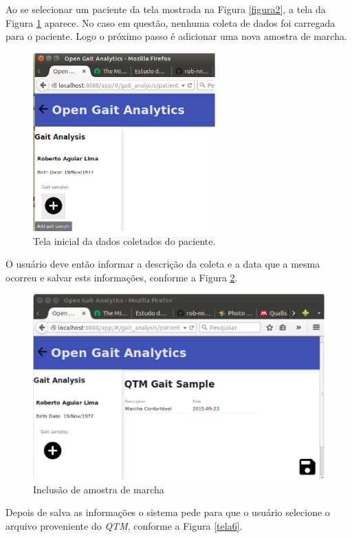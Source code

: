 Ao se selecionar um paciente da tela mostrada na Figura \ref{figura2}, a tela da Figura \ref{tela4} aparece. No caso em questão, nenhuma coleta de dados foi carregada para o paciente. Logo o próximo passo é adicionar uma nova amostra de marcha.

\begin{figure}[ht]
	\centering
	\includegraphics[width=7cm]{figuras/tela4.eps}
	\caption{Tela inicial da dados coletados do paciente.}
	\label{tela4}
\end{figure}

O usuário deve então informar a descrição da coleta e a data que a mesma ocorreu e salvar ests informações, conforme a Figura \ref{tela5}.

\begin{figure}[ht]
	\centering
	\includegraphics[width=15cm]{figuras/tela5.eps}
	\caption{Inclusão de amostra de marcha}

	\label{tela5}
\end{figure}

Depois de salva as informações o sistema pede para que o usuário selecione o arquivo proveniente do \emph{QTM}, conforme a Figura \ref{tela6}.


